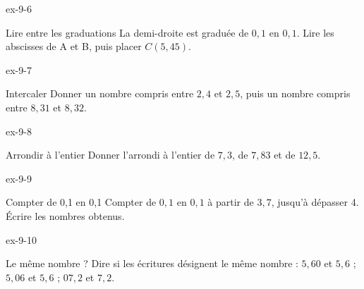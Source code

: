 \begin{blocLivre}{ex-9-6}\begin{exercice}[2]{Lire entre les graduations}
La demi-droite est graduée de $0{,}1$ en $0{,}1$. Lire les abscisses de A et B, puis placer $C(5{,}45)$.
\label{fig-ex-9-6}
\end{exercice}\end{blocLivre}
\begin{blocLivre}{ex-9-7}\begin{exercice}[2]{Intercaler}
Donner un nombre compris entre $2{,}4$ et $2{,}5$, puis un nombre compris entre $8{,}31$ et $8{,}32$.
\end{exercice}\end{blocLivre}
\begin{blocLivre}{ex-9-8}\begin{exercice}[2]{Arrondir à l’entier}
Donner l’arrondi à l’entier de $7{,}3$, de $7{,}83$ et de $12{,}5$.
\end{exercice}\end{blocLivre}
\begin{blocLivre}{ex-9-9}\begin{exercice}[2]{Compter de 0,1 en 0,1}
Compter de $0{,}1$ en $0{,}1$ à partir de $3{,}7$, jusqu’à dépasser 4. Écrire les nombres obtenus.
\end{exercice}\end{blocLivre}
\begin{blocLivre}{ex-9-10}\begin{exercice}[2]{Le même nombre ?}
Dire si les écritures désignent le même nombre : $5{,}60$ et $5{,}6$ ; $5{,}06$ et $5{,}6$ ; $07{,}2$ et $7{,}2$.
\end{exercice}\end{blocLivre}

